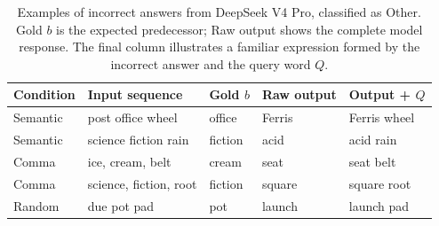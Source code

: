 \begin{table}[!htbp]
\centering
\small
\setlength{\tabcolsep}{5pt}
\renewcommand{\arraystretch}{1.12}
\caption{Examples of incorrect answers from DeepSeek V4 Pro, classified as
Other. Gold $b$ is the expected predecessor; Raw output shows the complete
model response. The final column illustrates a familiar expression formed
by the incorrect answer and the query word $Q$.}
\label{tab:predecessor-error-examples}
\begin{tabular}{@{}lllll@{}}
\toprule
Condition & Input sequence & Gold $b$ & Raw output & Output + $Q$ \\
\midrule
Semantic & post office wheel & office & Ferris & Ferris wheel \\
Semantic & science fiction rain & fiction & acid & acid rain \\
Comma & ice, cream, belt & cream & seat & seat belt \\
Comma & science, fiction, root & fiction & square & square root \\
Random & due pot pad & pot & launch & launch pad \\
\bottomrule
\end{tabular}
\end{table}
